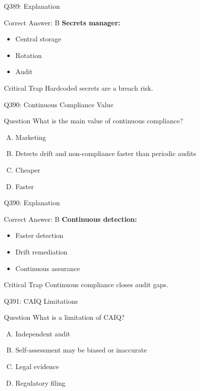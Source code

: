 \documentclass{beamer}
\begin{document}
	\begin{frame}{Q389: Explanation}
		\begin{block}{Correct Answer: B}
			\textbf{Secrets manager:}
			\begin{itemize}
				\item Central storage
				\item Rotation
				\item Audit
			\end{itemize}
		\end{block}
		\begin{alertblock}{Critical Trap}
			Hardcoded secrets are a breach risk.
		\end{alertblock}
	\end{frame}
	
	\begin{frame}{Q390: Continuous Compliance Value}
		\begin{block}{Question}
			What is the main value of continuous compliance?
		\end{block}
		\begin{enumerate}[(A)]
			\item Marketing
			\item Detects drift and non-compliance faster than periodic audits
			\item Cheaper
			\item Faster
		\end{enumerate}
	\end{frame}
	
	\begin{frame}{Q390: Explanation}
		\begin{block}{Correct Answer: B}
			\textbf{Continuous detection:}
			\begin{itemize}
				\item Faster detection
				\item Drift remediation
				\item Continuous assurance
			\end{itemize}
		\end{block}
		\begin{alertblock}{Critical Trap}
			Continuous compliance closes audit gaps.
		\end{alertblock}
	\end{frame}
	
	\begin{frame}{Q391: CAIQ Limitations}
		\begin{block}{Question}
			What is a limitation of CAIQ?
		\end{block}
		\begin{enumerate}[(A)]
			\item Independent audit
			\item Self-assessment may be biased or inaccurate
			\item Legal evidence
			\item Regulatory filing
		\end{enumerate}
	\end{frame}
	
\end{document}
